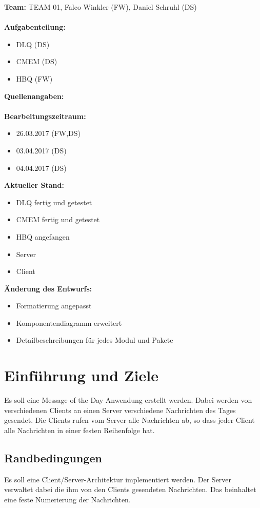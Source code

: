 \documentclass{article}
\begin{document}
\textbf{Team:} TEAM 01, Falco Winkler (FW), Daniel Schruhl (DS)\\
\\
\textbf{Aufgabenteilung:}
\begin{itemize}
    \item DLQ (DS)
    \item CMEM (DS)
	\item HBQ (FW)
\end{itemize}

\textbf{Quellenangaben:}\\
\\
\textbf{Bearbeitungszeitraum:}
\begin{itemize}
	\item 26.03.2017 (FW,DS)
	\item 03.04.2017 (DS)
	\item 04.04.2017 (DS)
\end{itemize}

\textbf{Aktueller Stand:}
\begin{itemize}
	\item DLQ fertig und getestet
	\item CMEM fertig und getestet
	\item HBQ angefangen
	\item Server
	\item Client
\end{itemize}

\textbf{Änderung des Entwurfs:}
\begin{itemize}
    \item Formatierung angepasst
	\item Komponentendiagramm erweitert
	\item Detailbeschreibungen für jedes Modul und Pakete
\end{itemize}

\newpage
\tableofcontents 
\newpage

\section{Einführung und Ziele}
Es soll eine Message of the Day Anwendung erstellt werden. Dabei werden von verschiedenen Clients an einen Server verschiedene Nachrichten des Tages gesendet. Die Clients rufen vom Server alle Nachrichten ab, so dass jeder Client alle Nachrichten in einer festen Reihenfolge hat.

\subsection{Randbedingungen}
Es soll eine Client/Server-Architektur implementiert werden.
Der Server verwaltet dabei die ihm von den Clients gesendeten Nachrichten. Das beinhaltet eine feste Numerierung der Nachrichten.
\end{document}
